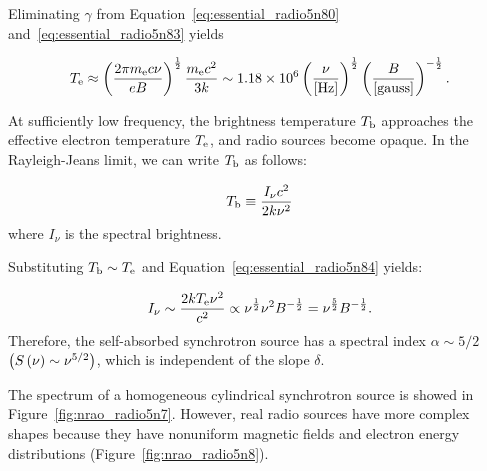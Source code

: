 Eliminating $\gamma$ from Equation~\ref{eq:essential_radio5n80} and~\ref{eq:essential_radio5n83} yields

\begin{equation}\label{eq:essential_radio5n84}
    T_{\mathrm{e}} \approx \left(\frac{2 \pi m_{\mathrm{e}} c \nu}{e B}\right)^{\frac{1}{2}} \frac{m_{\mathrm{e}} c^2}{3 k} \sim 1.18 \times 10^6\left(\frac{\nu}{\left[\mathrm{Hz}\right]}\right)^{\frac{1}{2}}\left(\frac{B}{\left[\mathrm{gauss}\right]}\right)^{-\frac{1}{2}}.
\end{equation}

At sufficiently low frequency, the brightness temperature $T_{\mathrm{b}}$ approaches the effective electron temperature $T_{\mathrm{e}}$, and radio sources become opaque.
In the Rayleigh-Jeans limit, we can write $T_{\mathrm{b}}$ as follows:

\begin{equation}\label{eq:essential_radio5n87}
    T_{\mathrm{b}} \equiv \frac{I_{\nu}c^2}{2k\nu^2}
\end{equation}
where $I_{\nu}$ is the spectral brightness.

Substituting $T_{\mathrm{b}} \sim T_{\mathrm{e}}$ and Equation~\ref{eq:essential_radio5n84} yields:

\begin{equation}\label{eq:essential_radio5n88}
    I_{\nu} \sim \frac{2kT_{\mathrm{e}}\nu^2}{c^2} \propto \nu^{\frac{1}{2}}\nu^2 B^{-\frac{1}{2}} = \nu^{\frac{5}{2}} B^{-\frac{1}{2}}.
\end{equation}
Therefore, the self-absorbed synchrotron source has a spectral index $\alpha\sim 5 /2$ $\left(S\left(\nu\right) \sim \nu^{5/2}\right)$, which is independent of the slope $\delta$.

The spectrum of a homogeneous cylindrical synchrotron source is showed in Figure~\ref{fig:nrao_radio5n7}.
However, real radio sources have more complex shapes because they have nonuniform magnetic fields and electron energy distributions (Figure~\ref{fig:nrao_radio5n8}).

